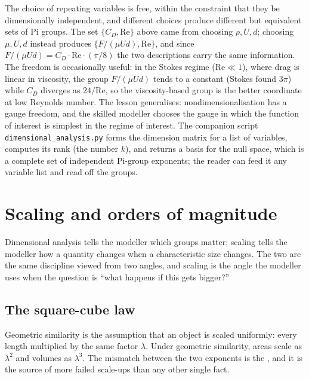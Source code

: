 \begin{mastery}
The choice of repeating variables is free, within the constraint that
they be dimensionally independent, and different choices produce
different but equivalent sets of Pi groups. The set
$\{C_D, \mathrm{Re}\}$ above came from choosing $\rho, U, d$; choosing
$\mu, U, d$ instead produces $\{F/(\mu U d), \mathrm{Re}\}$, and since
$F/(\mu U d) = C_D \cdot \mathrm{Re} \cdot (\pi/8)$ the two
descriptions carry the same information. The freedom is occasionally
useful: in the Stokes regime ($\mathrm{Re} \ll 1$), where drag is
linear in viscosity, the group $F/(\mu U d)$ tends to a constant
(Stokes found $3\pi$) while $C_D$ diverges as $24/\mathrm{Re}$, so the
viscosity-based group is the better coordinate at low Reynolds number.
The lesson generalises: nondimensionalisation has a gauge freedom, and
the skilled modeller chooses the gauge in which the function of interest
is simplest in the regime of interest. The companion script
\texttt{dimensional\_analysis.py} forms the dimension matrix for a list
of variables, computes its rank (the number $k$), and returns a basis
for the null space, which is a complete set of independent Pi-group
exponents; the reader can feed it any variable list and read off the
groups.
\end{mastery}

\section{Scaling and orders of magnitude}

Dimensional analysis tells the modeller which groups matter; scaling
tells the modeller how a quantity changes when a characteristic size
changes. The two are the same discipline viewed from two angles, and
scaling is the angle the modeller uses when the question is ``what
happens if this gets bigger?''

\subsection{The square-cube law}

Geometric similarity is the assumption that an object is scaled
uniformly: every length multiplied by the same factor $\lambda$. Under
geometric similarity, areas scale as $\lambda^2$ and volumes as
$\lambda^3$. The mismatch between the two exponents is the
, and it is the source of more failed
scale-ups than any other single fact.

